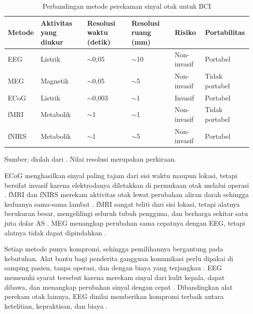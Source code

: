 \begin{table}[H]
  \centering
  \begin{threeparttable}[t]
    \caption{Perbandingan metode perekaman sinyal otak untuk BCI}
    \label{tab:metode-perekaman}
    \begin{tabularx}{\textwidth}{| l | Y | Y | Y | Y | Y |}
      \hline
      \textbf{Metode} & \textbf{Aktivitas yang diukur} & \textbf{Resolusi waktu (detik)} & \textbf{Resolusi ruang (mm)} & \textbf{Risiko} & \textbf{Portabilitas} \\
      \hline
      EEG   & Listrik  & $\sim$0,05  & $\sim$10 & Non-invasif & Portabel \\
      MEG   & Magnetik & $\sim$0,05  & $\sim$5  & Non-invasif & Tidak portabel \\
      ECoG  & Listrik  & $\sim$0,003 & $\sim$1  & Invasif     & Portabel \\
      fMRI  & Metabolik & $\sim$1    & $\sim$1  & Non-invasif & Tidak portabel \\
      fNIRS & Metabolik & $\sim$1    & $\sim$5  & Non-invasif & Portabel \\
      \hline
    \end{tabularx}
    \begin{tablenotes}
      \footnotesize
      \item[] Sumber: diolah dari \textcite{nicolasalonso2012}. Nilai resolusi merupakan perkiraan.
    \end{tablenotes}
  \end{threeparttable}
\end{table}

ECoG menghasilkan sinyal paling tajam dari sisi waktu maupun lokasi, tetapi bersifat invasif karena elektrodanya diletakkan di permukaan otak melalui operasi \parencite{nicolasalonso2012}.
fMRI dan fNIRS merekam aktivitas otak lewat perubahan aliran darah sehingga keduanya sama-sama lambat \parencite{frey2014}.
fMRI sangat teliti dari sisi lokasi, tetapi alatnya berukuran besar, mengelilingi seluruh tubuh pengguna, dan berharga sekitar satu juta dolar AS \parencite{frey2014}.
MEG menangkap perubahan sama cepatnya dengan EEG, tetapi alatnya tidak dapat dipindahkan \parencite{nicolasalonso2012}.

Setiap metode punya kompromi, sehingga pemilihannya bergantung pada kebutuhan.
Alat bantu bagi penderita gangguan komunikasi perlu dipakai di samping pasien, tanpa operasi, dan dengan biaya yang terjangkau \parencite{shih2012}.
EEG memenuhi syarat tersebut karena merekam sinyal dari kulit kepala, dapat dibawa, dan menangkap perubahan sinyal dengan cepat \parencite{nicolasalonso2012}.
Dibandingkan alat perekam otak lainnya, EEG dinilai memberikan kompromi terbaik antara ketelitian, kepraktisan, dan biaya \parencite{frey2014}.

